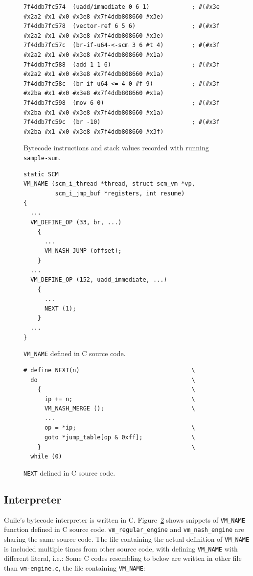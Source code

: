 \documentclass[preprint]{sigplanconf}
\begin{document}
\begin{figure}
  \centering
\begin{verbatim}
7f4ddb7fc574  (uadd/immediate 0 6 1)            ; #(#x3e #x2a2 #x1 #x0 #x3e8 #x7f4ddb808660 #x3e)
7f4ddb7fc578  (vector-ref 6 5 6)                ; #(#x3f #x2a2 #x1 #x0 #x3e8 #x7f4ddb808660 #x3e)
7f4ddb7fc57c  (br-if-u64-<-scm 3 6 #t 4)        ; #(#x3f #x2a2 #x1 #x0 #x3e8 #x7f4ddb808660 #x1a)
7f4ddb7fc588  (add 1 1 6)                       ; #(#x3f #x2a2 #x1 #x0 #x3e8 #x7f4ddb808660 #x1a)
7f4ddb7fc58c  (br-if-u64-<= 4 0 #f 9)           ; #(#x3f #x2ba #x1 #x0 #x3e8 #x7f4ddb808660 #x1a)
7f4ddb7fc598  (mov 6 0)                         ; #(#x3f #x2ba #x1 #x0 #x3e8 #x7f4ddb808660 #x1a)
7f4ddb7fc59c  (br -10)                          ; #(#x3f #x2ba #x1 #x0 #x3e8 #x7f4ddb808660 #x3f)
\end{verbatim}
\caption{Bytecode instructions and stack values recorded with running
  \texttt{sample-sum}.}
\label{fig:trace}
\end{figure}

\begin{figure}
  \centering
\begin{verbatim}
static SCM
VM_NAME (scm_i_thread *thread, struct scm_vm *vp,
         scm_i_jmp_buf *registers, int resume)
{
  ...
  VM_DEFINE_OP (33, br, ...)
    {
      ...
      VM_NASH_JUMP (offset);
    }
  ...
  VM_DEFINE_OP (152, uadd_immediate, ...)
    {
      ...
      NEXT (1);
    }
  ...
}
\end{verbatim}
\caption{\texttt{VM\_NAME} defined in C source code.}
\label{fig:vmname}
\end{figure}

\begin{figure}
\begin{verbatim}
# define NEXT(n)                                \
  do                                            \
    {                                           \
      ip += n;                                  \
      VM_NASH_MERGE ();                         \
      ...
      op = *ip;                                 \
      goto *jump_table[op & 0xff];              \
    }                                           \
  while (0)
\end{verbatim}
\caption{\texttt{NEXT} defined in C source code.}
\label{fig:cnext}
\end{figure}

\subsection{Interpreter}
Guile's bytecode interpreter is written in
C. Figure~\hyperref[fig:vmname]{\ref{fig:vmname}} shows snippets of
\texttt{VM\_NAME} function defined in C source
code. \texttt{vm\_regular\_engine} and \texttt{vm\_nash\_engine} are sharing
the same source code. The file containing the actual definition of
\texttt{VM\_NAME} is included multiple times from other source code, with
defining \texttt{VM\_NAME} with different literal, i.e.: Some C codes
resembling to below are written in other file than \texttt{vm-engine.c}, the
file containing \texttt{VM\_NAME}:
\end{document}
